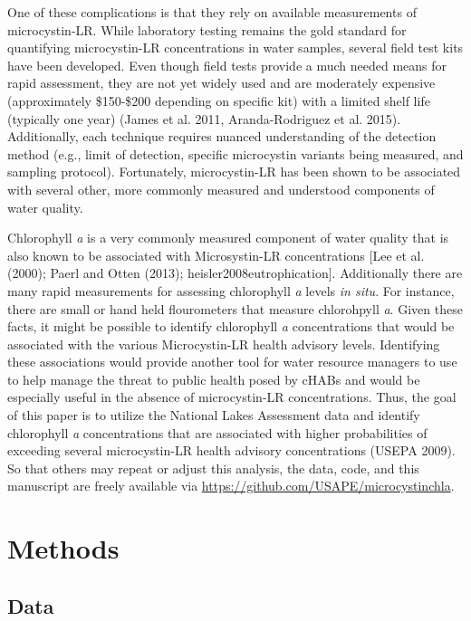 \documentclass[11pt,]{article}
\begin{document}
One of these complications is that they rely on available measurements
of microcystin-LR. While laboratory testing remains the gold standard
for quantifying microcystin-LR concentrations in water samples, several
field test kits have been developed. Even though field tests provide a
much needed means for rapid assessment, they are not yet widely used and
are moderately expensive (approximately \$150-\$200 depending on
specific kit) with a limited shelf life (typically one year) (James et
al. 2011, Aranda-Rodriguez et al. 2015). Additionally, each technique
requires nuanced understanding of the detection method (e.g., limit of
detection, specific microcystin variants being measured, and sampling
protocol). Fortunately, microcystin-LR has been shown to be associated
with several other, more commonly measured and understood components of
water quality.

Chlorophyll \emph{a} is a very commonly measured component of water
quality that is also known to be associated with Microsystin-LR
concentrations {[}Lee et al. (2000); Paerl and Otten (2013);
heisler2008eutrophication{]}. Additionally there are many rapid
measurements for assessing chlorophyll \emph{a} levels \emph{in situ}.
For instance, there are small or hand held flourometers that measure
chlorohpyll \emph{a}. Given these facts, it might be possible to
identify chlorophyll \emph{a} concentrations that would be associated
with the various Microcystin-LR health advisory levels. Identifying
these associations would provide another tool for water resource
managers to use to help manage the threat to public health posed by
cHABs and would be especially useful in the absence of microcystin-LR
concentrations. Thus, the goal of this paper is to utilize the National
Lakes Assessment data and identify chlorophyll \emph{a} concentrations
that are associated with higher probabilities of exceeding several
microcystin-LR health advisory concentrations (USEPA 2009). So that
others may repeat or adjust this analysis, the data, code, and this
manuscript are freely available via
\href{https://github.com/USAPE/microcystinchla}{\url{https://github.com/USAPE/microcystinchla}}.

\section{Methods}\label{methods}

\subsection{Data}\label{data}
\end{document}
